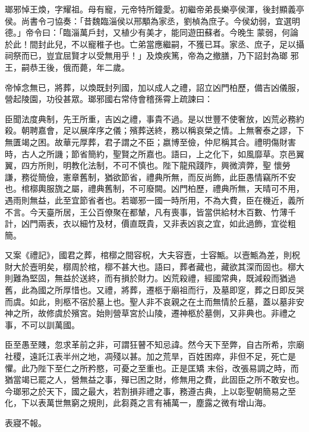 \begin{pinyinscope}
 瑯邪悼王煥，字耀祖。母有寵，元帝特所鐘愛。初繼帝弟長樂亭侯渾，後封顯義亭侯。尚書令刁協奏：「昔魏臨淄侯以邢顒為家丞，劉楨為庶子。今侯幼弱，宜選明德。」帝令曰：「臨淄萬戶封，又植少有美才，能同遊田蘇者。今晚生蒙弱，何論於此！間封此兒，不以寵稚子也。亡弟當應繼嗣，不獲已耳。家丞、庶子，足以攝祠祭而已，豈宜屈賢才以受無用乎！」及煥疾篤，帝為之撤膳，乃下詔封為瑯
 邪王，嗣恭王後，俄而薨，年二歲。



 帝悼念無已，將葬，以煥既封列國，加以成人之禮，詔立凶門柏歷，備吉凶儀服，營起陵園，功役甚眾。瑯邪國右常侍會稽孫霄上疏諫曰：



 臣聞法度典制，先王所重，吉凶之禮，事貴不過。是以世豐不使奢放，凶荒必務約殺。朝聘嘉會，足以展庠序之儀；殯葬送終，務以稱哀榮之情。上無奢泰之謬，下無匱竭之困。故華元厚葬，君子謂之不臣；嬴博至儉，仲尼稱其合。禮明傷財害時，古人之所譏；節省簡約，聖賢之所嘉也。語曰，上之化下，如風靡草。京邑翼翼，四方所則，明教化法制，不可不慎也。陛下龍飛踐阼，興微濟弊，聖
 懷勞謙，務從簡儉，憲章舊制，猶欲節省，禮典所無，而反尚飾，此臣愚情竊所不安也。棺槨輿服旒之屬，禮典舊制，不可廢闕。凶門柏歷，禮典所無，天晴可不用，遇雨則無益，此至宜節省者也。若瑯邪一國一時所用，不為大費，臣在機近，義所不言。今天臺所居，王公百僚聚在都輦，凡有喪事，皆當供給材木百數、竹薄千計，凶門兩表，衣以細竹及材，價直既貴，又非表凶哀之宜，如此過飾，宜從粗簡。



 又案《禮記》，國君之葬，棺槨之間容柷，大夫容壼，士容甒。以壼甒為差，則柷財大於壼明矣，槨周於棺，槨不甚大也。語曰，葬者藏也，藏欲其深而固也。槨大
 則難為堅固，無益於送終，而有損於財力。凶荒殺禮，經國常典，既減殺而猶過舊，此為國之所厚惜也。又禮，將葬，遷柩于廟祖而行，及墓即窆，葬之日即反哭而虞。如此，則柩不宿於墓上也。聖人非不哀親之在土而無情於丘墓，蓋以墓非安神之所，故修虞於殯宮。始則營草宮於山陵，遷神柩於墓側，又非典也。非禮之事，不可以訓萬國。



 臣至愚至賤，忽求革前之非，可謂狂瞽不知忌諱。然今天下至弊，自古所希，宗廟社稷，遠託江表半州之地，凋殘以甚。加之荒旱，百姓困瘁，非但不足，死亡是懼。此乃陛下至仁之所矜愍，可憂之至重也。正是匡矯
 末俗，改張易調之時，而猶當竭已罷之人，營無益之事，殫已困之財，修無用之費，此固臣之所不敢安也。今瑯邪之於天下，國之最大，若割損非禮之事，務遵古典，上以彰聖朝簡易之至化，下以表萬世無窮之規則，此芻蕘之言有補萬一，塵露之微有增山海。



 表寢不報。




\end{pinyinscope}
